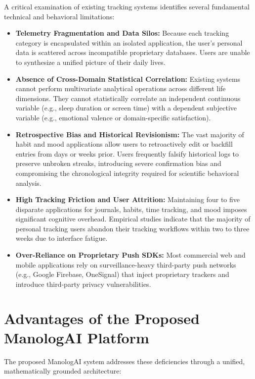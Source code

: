 A critical examination of existing tracking systems identifies several fundamental technical and behavioral limitations:

\begin{itemize}
  \item \textbf{Telemetry Fragmentation and Data Silos:} Because each tracking category is encapsulated within an isolated application, the user's personal data is scattered across incompatible proprietary databases. Users are unable to synthesize a unified picture of their daily lives.
  \item \textbf{Absence of Cross-Domain Statistical Correlation:} Existing systems cannot perform multivariate analytical operations across different life dimensions. They cannot statistically correlate an independent continuous variable (e.g., sleep duration or screen time) with a dependent subjective variable (e.g., emotional valence or domain-specific satisfaction).
  \item \textbf{Retrospective Bias and Historical Revisionism:} The vast majority of habit and mood applications allow users to retroactively edit or backfill entries from days or weeks prior. Users frequently falsify historical logs to preserve unbroken streaks, introducing severe confirmation bias and compromising the chronological integrity required for scientific behavioral analysis.
  \item \textbf{High Tracking Friction and User Attrition:} Maintaining four to five disparate applications for journals, habits, time tracking, and mood imposes significant cognitive overhead. Empirical studies indicate that the majority of personal tracking users abandon their tracking workflows within two to three weeks due to interface fatigue.
  \item \textbf{Over-Reliance on Proprietary Push SDKs:} Most commercial web and mobile applications rely on surveillance-heavy third-party push networks (e.g., Google Firebase, OneSignal) that inject proprietary trackers and introduce third-party privacy vulnerabilities.
\end{itemize}

\section{Advantages of the Proposed ManologAI Platform}

The proposed ManologAI system addresses these deficiencies through a unified, mathematically grounded architecture:

